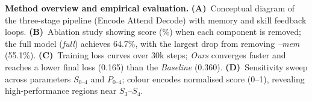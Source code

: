 \caption{\textbf{Method overview and empirical evaluation.}
\textbf{(A)}~Conceptual diagram of the three-stage pipeline (Encode\,\textrightarrow\,Attend\,\textrightarrow\,Decode) with memory and skill feedback loops.
\textbf{(B)}~Ablation study showing score (\%) when each component is removed; the full model (\textit{full}) achieves 64.7\%, with the largest drop from removing \textit{--mem} (55.1\%).
\textbf{(C)}~Training loss curves over 30k steps; \textit{Ours} converges faster and reaches a lower final loss (0.165) than the \textit{Baseline} (0.360).
\textbf{(D)}~Sensitivity sweep across parameters \(S_{0\text{--}4}\) and \(P_{0\text{--}4}\); colour encodes normalised score (0--1), revealing high-performance regions near \(S_3\)--\(S_4\).}
